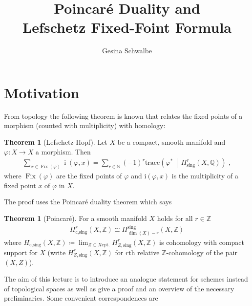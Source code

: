 \documentclass[english]{scrartcl}
\theoremstyle{definition}
\newtheorem{Thm}[Def]{Theorem}
\theoremstyle{remark}
\newcommand*{\N}{\mathds{N}}
\newcommand*{\Z}{\mathds{Z}}
\newcommand*{\Q}{\mathds{Q}}
\newcommand*{\trace}[2]{{\text{trace}\left(#1 \,\middle|\, #2 \right)}} %
\renewcommand*{\phi}{\varphi}
\begin{document}
\clearpairofpagestyles
{}
\cfoot*{\pagemark}

\title{Poincaré Duality and\\
  Lefschetz Fixed-Foint Formula}
\subject{Seminar:
  Deligne's proof of the Weil Conjecture%
}
\author{Gesina Schwalbe}
\maketitle
\tableofcontents

\section{Motivation}
From topology the following theorem is known that relates the fixed
points of a morphism (counted with multiplicity) with homology:
\begin{Thm}[Lefschetz-Hopf]
  Let $X$ be a compact, smooth manifold and
  $\phi\colon X\to X$ a morphism. Then
  \begin{gather*}
    \sum_{x\in\operatorname{Fix}(\phi)} \operatorname{i}(\phi,x)
    =\sum_{r\in\N}(-1)^r \trace{\phi^*}{H_\text{sing}^r(X,\Q)}\;,
  \end{gather*}
  where $\operatorname{Fix}(\phi)$ are the fixed points of $\phi$ and
  $\mathrm i(\phi,x)$ is the multiplicity of a fixed point $x$ of $\phi$
  in $X$.
\end{Thm}
The proof uses the Poincaré duality theorem which says
\begin{Thm}[Poincaré]
  For a smooth manifold $X$ holds for all $r\in\Z$
  \begin{gather*}
    H_{\text{c,sing}}^r(X,\Z) \cong H_{\dim(X)-r}^{\text{sing}}(X,\Z)
  \end{gather*}
  where $H_{\text{c,sing}}(X,\Z)\coloneqq
  \lim_{Z\subset X \text{cpt.}}H_{Z,\text{sing}}^r(X,\Z)$
  is cohomology with compact support for $X$
  (write $H_{Z,\text{sing}}^r(X,\Z)$ for $r$th relative
  $\Z$-cohomology of the pair $(X,Z)$).
\end{Thm}
The aim of this lecture is to introduce an analogue statement for
schemes instead of topological spaces as well as give a proof and an
overview of the necessary preliminaries.
Some convenient correspondences are
\end{document}
